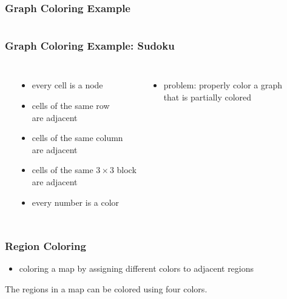 \documentclass[dvipsnames]{beamer}
\begin{document}
\begin{frame}
  \frametitle{Graph Coloring Example}

  \begin{columns}
    \begin{center}
    \end{center}

    \begin{center}
    \end{center}
  \end{columns}
\end{frame}

\begin{frame}
  \frametitle{Graph Coloring Example: Sudoku}

  \begin{columns}[t]
    \begin{center}
    \end{center}

    \begin{itemize}
      \item every cell is a node
      \item cells of the same row\\
        are adjacent
      \item cells of the same column\\
        are adjacent
      \item cells of the same $3 \times 3$ block\\
        are adjacent
      \item every number is a color
    \end{itemize}

    \pause
    \begin{itemize}
      \item problem: properly color a graph\\
        that is partially colored
    \end{itemize}
  \end{columns}
\end{frame}

\begin{frame}
  \frametitle{Region Coloring}

  \begin{itemize}
    \item coloring a map by assigning different colors to adjacent regions
  \end{itemize}

  \medskip
  \begin{theorem}
    The regions in a map can be colored using four colors.
  \end{theorem}
\end{frame}
\end{document}
